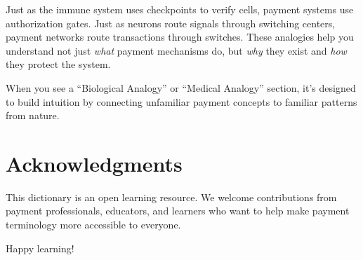 Just as the immune system uses checkpoints to verify cells, payment systems use authorization gates. Just as neurons route signals through switching centers, payment networks route transactions through switches. These analogies help you understand not just \textit{what} payment mechanisms do, but \textit{why} they exist and \textit{how} they protect the system.

When you see a ``Biological Analogy'' or ``Medical Analogy'' section, it's designed to build intuition by connecting unfamiliar payment concepts to familiar patterns from nature.

\section*{Acknowledgments}

This dictionary is an open learning resource. We welcome contributions from payment professionals, educators, and learners who want to help make payment terminology more accessible to everyone.

\vspace{1cm}
\noindent Happy learning!
